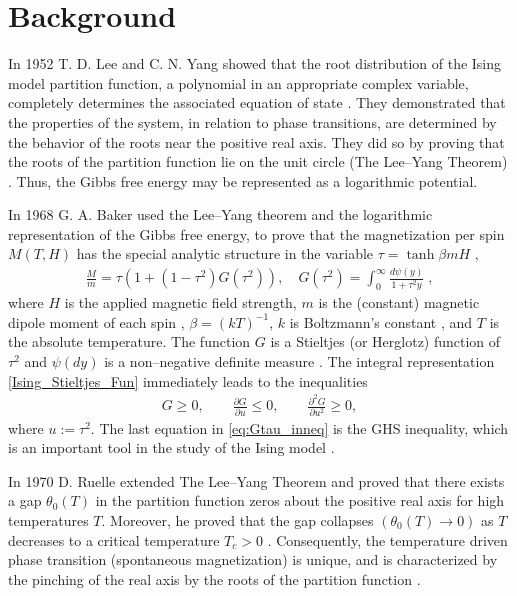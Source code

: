 \documentclass[english,12pt,jmp,graphicx]{revtex4-1}
\begin{document}
\section{Background}\label{sec:Background}
%
In 1952 T. D. Lee and C. N. Yang showed that the root distribution of
the Ising model partition function, a polynomial in an appropriate
complex variable, completely determines the associated equation of
state \cite{Yang:PR:404}. They demonstrated that the properties
of the system, in relation to phase transitions, are determined by the
behavior of the roots near the positive real axis. They did so by
proving that the roots of the partition function lie on the unit circle
(The Lee--Yang Theorem) \cite{Lee:PR:411,Ruelle-1969}. Thus, the Gibbs
free energy may be represented as a logarithmic potential.

In 1968 G. A. Baker used the
Lee--Yang theorem and the logarithmic representation of the Gibbs free
energy, to prove that the magnetization per spin $M(T,H)$
has the special analytic structure in the variable $\tau=\tanh{\beta mH}$
\cite{Baker:PRL-990}, 
%
\begin{align}\label{Ising_Stieltjes_Fun}
  \frac{M}{m} =\tau(1+(1-\tau^2)G(\tau^2)), \quad
  G(\tau^2)=\int_0^\infty\frac{d\psi(y)}{1+\tau^2y}\;, %
\end{align}
%
where $H$ is the applied magnetic field strength, $m$ is the
(constant) magnetic dipole moment of each spin \cite{Griffiths-1999},
$\beta=(kT)^{-1}$, $k$ is Boltzmann's constant \cite{Thompson-1988}, and
$T$ is the absolute temperature. The function $G$ is a Stieltjes (or
Herglotz) function of $\tau^2$ and $\psi(dy)$ is a non--negative definite
measure \cite{Baker:PRL-990}.  The integral representation
\eqref{Ising_Stieltjes_Fun} immediately leads to the inequalities   
%
\begin{align}\label{eq:Gtau_inneq}
  G\geq0, \qquad \frac{\partial G}{\partial u}\leq0, \qquad \frac{\partial^2G}{\partial u^2}\geq0,
\end{align}
%
where $u:=\tau^2$. The last equation in \eqref{eq:Gtau_inneq} is the GHS
inequality, which is an important tool in the study of the Ising model
\cite{Golden:JMP-5627}. 

In 1970 D. Ruelle extended The Lee--Yang Theorem and proved that
there exists a gap $\theta_0(T)$ in the partition function zeros about the
positive real axis for high temperatures $T$. Moreover, he proved that
the gap collapses $(\theta_0(T)\to0)$ as $T$ decreases to a critical
temperature $T_c>0$ \cite{Ruelle:PRL:303}. Consequently, the
temperature driven phase transition (spontaneous magnetization) is
unique, and is characterized by the pinching of the real axis by the
roots of the partition function \cite{Ruelle-1969,Ruelle:AM:589}. 
\end{document}
